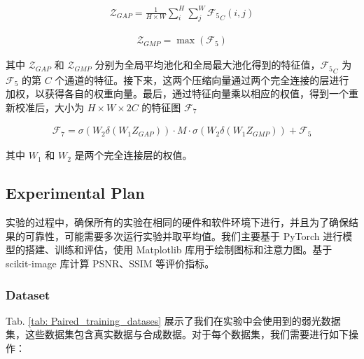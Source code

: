 \documentclass[a4paper, 10pt]{article}
\begin{document}
		\begin{equation}
			\begin{aligned}
				\mathcal{Z}_{GAP} = \frac{1}{H \times W} \sum_{i}^{H} \sum_{j}^{W} {\mathcal{F}_5}_C (i,j)
			\end{aligned}
			\label{eq: avgpool}
		\end{equation}
		
		\begin{equation}
			\begin{aligned}
				\mathcal{Z}_{GMP} = \max \left( \mathcal{F}_5 \right)
			\end{aligned}
			\label{eq: maxpool}
		\end{equation}
		
		其中 $\mathcal{Z}_{GAP}$ 和 $\mathcal{Z}_{GMP}$ 分别为全局平均池化和全局最大池化得到的特征值，${\mathcal{F}_5}_C$ 为 $\mathcal{F}_5$ 的第 $C$ 个通道的特征。接下来，这两个压缩向量通过两个完全连接的层进行加权，以获得各自的权重向量。最后，通过特征向量乘以相应的权值，得到一个重新校准后，大小为 $H \times W \times 2C$ 的特征图 $\mathcal{F}_7$
		
		\begin{equation}
			\begin{aligned}
				\mathcal{F}_7 = \sigma \left( W_2 \delta (W_1 Z_{GAP}) \right) \cdot M \cdot \sigma \left( W_2 \delta (W_1 Z_{GMP})\right) +  \mathcal{F}_5
			\end{aligned}
			\label{eq: recalibrated feature map}
		\end{equation}
		
		其中 $W_1$ 和 $W_2$ 是两个完全连接层的权值。
		
		\subsection{Experimental Plan}

		实验的过程中，确保所有的实验在相同的硬件和软件环境下进行，并且为了确保结果的可靠性，可能需要多次运行实验并取平均值。我们主要基于 PyTorch 进行模型的搭建、训练和评估，使用 Matplotlib 库用于绘制图标和注意力图。基于 scikit-image 库计算 PSNR、SSIM 等评价指标。

		\subsubsection{Dataset}
		
		Tab. \ref{tab: Paired_training_datases} 展示了我们在实验中会使用到的弱光数据集，这些数据集包含真实数据与合成数据。对于每个数据集，我们需要进行如下操作：
		
\end{document}
